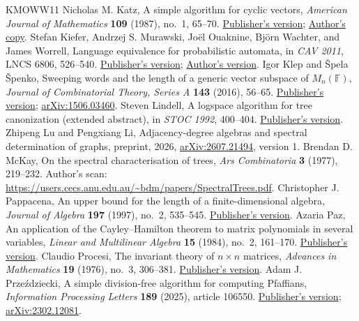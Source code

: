 \documentclass[11pt,letterpaper]{article}
\theoremstyle{definition}\newtheorem{definition}[theorem]{Definition}
\theoremstyle{remark}\newtheorem{remark}[theorem]{Remark}
\begin{document}
\begin{thebibliography}{KMOWW11}
 Nicholas M. Katz, A simple algorithm for cyclic vectors, \emph{American Journal of Mathematics} \textbf{109} (1987), no.~1, 65--70. \href{https://doi.org/10.2307/2374551}{Publisher's version}; \href{https://web.math.princeton.edu/~nmk/old/simplealgorithm.pdf}{Author's copy}.
 Stefan Kiefer, Andrzej S. Murawski, Jo\"el Ouaknine, Bj\"orn Wachter, and James Worrell, Language equivalence for probabilistic automata, in \emph{CAV 2011}, LNCS 6806, 526--540. \href{https://doi.org/10.1007/978-3-642-22110-1_42}{Publisher's version}; \href{https://people.mpi-sws.org/~joel/publications/langeqprobaut11.pdf}{Author's version}.
 Igor Klep and \v{S}pela \v{S}penko, Sweeping words and the length of a generic vector subspace of $M_n(\mathbb F)$, \emph{Journal of Combinatorial Theory, Series A} \textbf{143} (2016), 56--65. \href{https://doi.org/10.1016/j.jcta.2016.05.003}{Publisher's version}; \href{https://arxiv.org/abs/1506.03460}{arXiv:1506.03460}.
 Steven Lindell, A logspace algorithm for tree canonization (extended abstract), in \emph{STOC 1992}, 400--404. \href{https://doi.org/10.1145/129712.129750}{Publisher's version}.
 Zhipeng Lu and Pengxiang Li, Adjacency-degree algebras and spectral determination of graphs, preprint, 2026, \href{https://arxiv.org/abs/2607.21494v1}{arXiv:2607.21494}, version 1.
 Brendan D. McKay, On the spectral characterisation of trees, \emph{Ars Combinatoria} \textbf{3} (1977), 219--232. Author's scan: \url{https://users.cecs.anu.edu.au/~bdm/papers/SpectralTrees.pdf}.
 Christopher J. Pappacena, An upper bound for the length of a finite-dimensional algebra, \emph{Journal of Algebra} \textbf{197} (1997), no.~2, 535--545. \href{https://doi.org/10.1006/jabr.1997.7140}{Publisher's version}.
 Azaria Paz, An application of the Cayley--Hamilton theorem to matrix polynomials in several variables, \emph{Linear and Multilinear Algebra} \textbf{15} (1984), no.~2, 161--170. \href{https://doi.org/10.1080/03081088408817585}{Publisher's version}.
 Claudio Procesi, The invariant theory of $n\times n$ matrices, \emph{Advances in Mathematics} \textbf{19} (1976), no.~3, 306--381. \href{https://doi.org/10.1016/0001-8708(76)90027-X}{Publisher's version}.
 Adam J. Prze\'zdziecki, A simple division-free algorithm for computing Pfaffians, \emph{Information Processing Letters} \textbf{189} (2025), article 106550. \href{https://doi.org/10.1016/j.ipl.2024.106550}{Publisher's version}; \href{https://arxiv.org/abs/2302.12081}{arXiv:2302.12081}.

\end{thebibliography}
\end{document}
